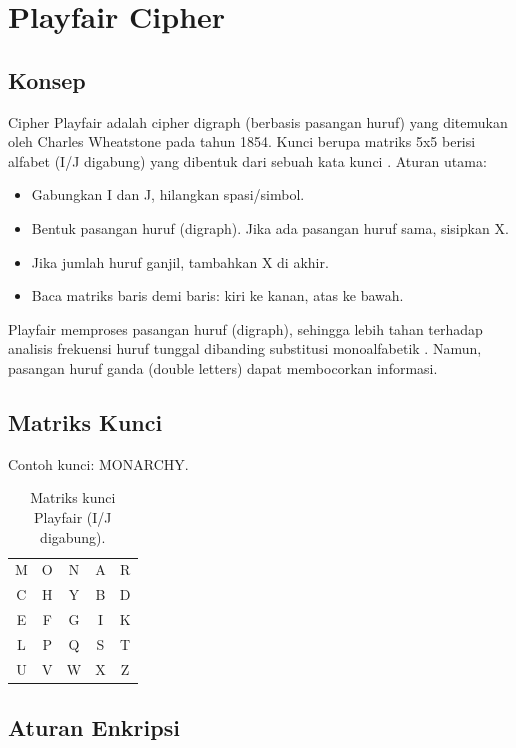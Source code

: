 \section{Playfair Cipher}

\subsection{Konsep}

Cipher Playfair adalah cipher digraph (berbasis pasangan huruf) yang ditemukan oleh Charles Wheatstone pada tahun 1854. Kunci berupa matriks 5x5 berisi alfabet (I/J digabung) yang dibentuk dari sebuah kata kunci \cite{stallings2017}. Aturan utama:
\begin{itemize}
  \item Gabungkan I dan J, hilangkan spasi/simbol.
  \item Bentuk pasangan huruf (digraph). Jika ada pasangan huruf sama, sisipkan X.
  \item Jika jumlah huruf ganjil, tambahkan X di akhir.
  \item Baca matriks baris demi baris: kiri ke kanan, atas ke bawah.
\end{itemize}

Playfair memproses pasangan huruf (digraph), sehingga lebih tahan terhadap analisis frekuensi huruf tunggal dibanding substitusi monoalfabetik \cite{schneier1996}. Namun, pasangan huruf ganda (double letters) dapat membocorkan informasi.

\subsection{Matriks Kunci}

Contoh kunci: MONARCHY.
\begin{table}[htbp]
  \centering
  \small
  \begin{tabular}{ccccc}
    \toprule
    M & O & N & A & R \\
    C & H & Y & B & D \\
    E & F & G & I & K \\
    L & P & Q & S & T \\
    U & V & W & X & Z \\
    \bottomrule
  \end{tabular}
  \caption{Matriks kunci Playfair (I/J digabung).}
\end{table}


\subsection{Aturan Enkripsi}

